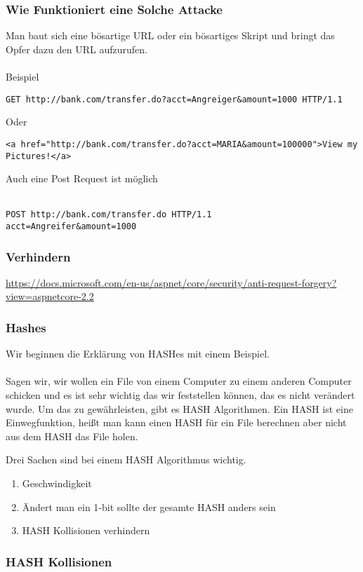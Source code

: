 {\subsubsection{Wie Funktioniert eine Solche Attacke}
Man baut sich eine bösartige URL oder ein bösartiges Skript und bringt das Opfer dazu den URL aufzurufen. 
\\ \\
Beispiel
\begin{lstlisting}
GET http://bank.com/transfer.do?acct=Angreiger&amount=1000 HTTP/1.1
\end{lstlisting}
Oder
\begin{lstlisting}
<a href="http://bank.com/transfer.do?acct=MARIA&amount=100000">View my Pictures!</a>
\end{lstlisting}
Auch eine Post Request ist möglich
\\ \\
\begin{lstlisting}
POST http://bank.com/transfer.do HTTP/1.1
acct=Angreifer&amount=1000
\end{lstlisting}
\subsubsection{Verhindern}
\url{https://docs.microsoft.com/en-us/aspnet/core/security/anti-request-forgery?view=aspnetcore-2.2}
\subsubsection{Hashes}
\label{hash-expl}
Wir beginnen die Erklärung von HASHes mit einem Beispiel.
\\ \\
Sagen wir, wir wollen ein File von einem Computer zu einem anderen Computer schicken und es ist sehr wichtig das wir feststellen können, das es nicht verändert wurde. Um das zu gewährleisten, gibt es HASH Algorithmen. Ein HASH ist eine Einwegfunktion, heißt man kann einen HASH für ein File berechnen aber nicht aus dem HASH das File holen. 

Drei Sachen sind bei einem HASH Algorithmus wichtig.
\begin{enumerate}
\item Geschwindigkeit
\item Ändert man ein 1-bit sollte der gesamte HASH anders sein
\item HASH Kollisionen verhindern 
\end{enumerate}

\subsubsection{HASH Kollisionen}

}
